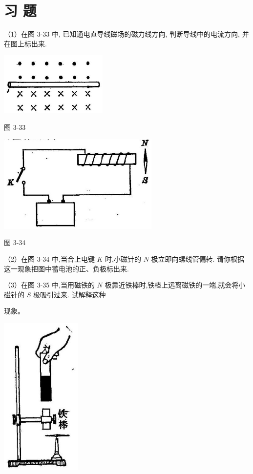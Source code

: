 \documentclass[10pt]{article}
\begin{document}
\section*{习 题}

（1）在图 3-33 中, 已知通电直导线磁场的磁力线方向, 判断导线中的电流方向, 并在图上标出来.

\begin{center}
\includegraphics[max width=0.4\textwidth]{images/01913056-1f15-74d8-9184-9aab52c9d66b_130_699631.jpg}
\end{center}

图 3-33

\begin{center}
\includegraphics[max width=0.6\textwidth]{images/01913056-1f15-74d8-9184-9aab52c9d66b_130_109826.jpg}
\end{center}

图 3-34

（2）在图 3-34 中,当合上电键 \(K\) 时,小磁针的 \(N\) 极立即向螺线管偏转. 请你根据这一现象把图中蓄电池的正、负极标出来.

（3）在图 3-35 中,当用磁铁的 \(N\) 极靠近铁棒时,铁棒上远离磁铁的一端,就会将小磁针的 \(S\) 极吸引过来. 试解释这种

现象。

\begin{center}
\includegraphics[max width=0.3\textwidth]{images/01913056-1f15-74d8-9184-9aab52c9d66b_131_344167.jpg}
\end{center}
\end{document}
